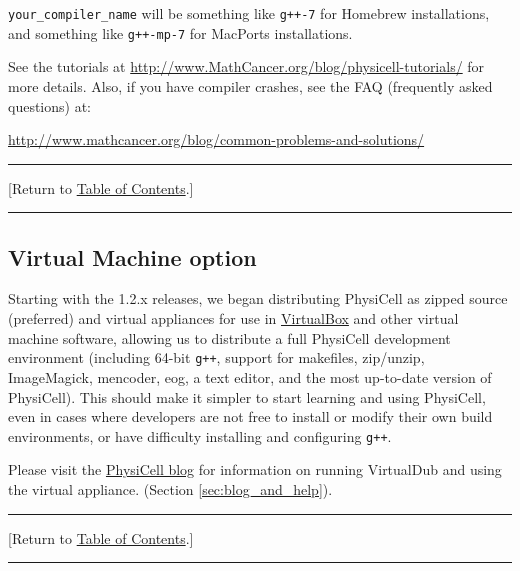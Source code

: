 \documentclass[12pt]{article}
\renewcommand{\v}{\verb}
\newcommand{\blue}[1]{\textcolor{blue}{#1}}
\newcommand{\DONE}{}%
\newcommand{\TOClink}{\begin{center}\hrule\vskip-10pt\phantom{.}\hfill[Return to \hyperlink{TOC}{Table of Contents}.]\hfill\phantom{.}\vskip3pt\hrule\end{center}}
\begin{document}
\v|your_compiler_name| will be something like \v|g++-7| for Homebrew installations, 
and something like \v|g++-mp-7| for MacPorts installations. 

See the tutorials at 
\href{http://www.mathcancer.org/blog/physicell-tutorials/}{http://www.MathCancer.org/blog/physicell-tutorials/}
for more details. Also, if you have compiler crashes, see the FAQ (frequently asked questions) at:

\href{http://www.mathcancer.org/blog/common-problems-and-solutions/}{http://www.mathcancer.org/blog/common-problems-and-solutions/}

\TOClink

\subsection{Virtual Machine option \DONE}
Starting with the 1.2.x releases, we began distributing PhysiCell as zipped source (preferred) %
and virtual appliances for use in \href{http://virtualbox.org}{VirtualBox} and other virtual machine software, 
allowing us to distribute a full PhysiCell 
development environment (including 64-bit \v|g++|, support for makefiles, zip/unzip, 
ImageMagick, mencoder, eog, a text editor, and the most up-to-date 
version of PhysiCell). This should make it simpler to start learning and using PhysiCell, even in cases 
where developers are not free to install or modify their own build environments, 
or have difficulty installing and configuring \v|g++|. 

Please visit the 
\href{http:/PhysiCell.MathCancer.org/blog/physicell-tutorials}{PhysiCell blog} 
for information on running VirtualDub and using the virtual appliance. 
(Section \ref{sec:blog_and_help}). 
\TOClink

%
\end{document}

